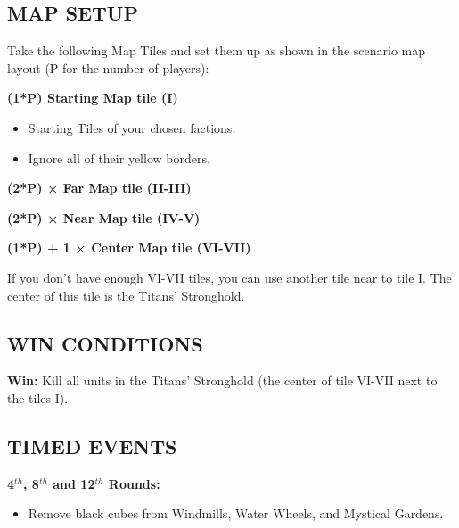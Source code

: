 \begin{multicols*}{2}
\subsection*{\MakeUppercase{Map setup}}

Take the following Map Tiles and set them up as shown in the scenario map layout (P for the number of players):

\textbf{(1*P) Starting Map tile (I)}
\begin{itemize}
    \item Starting Tiles of your chosen factions.
    \item Ignore all of their yellow borders.
\end{itemize}

\textbf{(2*P) × Far Map tile (II-III)}

\textbf{(2*P) × Near Map tile (IV-V)}

\textbf{(1*P) + 1 × Center Map tile (VI-VII)}

If you don't have enough VI-VII tiles, you can use another tile near to tile I.
The center of this tile is the Titans' Stronghold.

\subsection*{\MakeUppercase{Win Conditions}}

\textbf{Win:} Kill all units in the Titans' Stronghold (the center of tile VI-VII next to the tiles I).

\subsection*{\MakeUppercase{Timed Events}}

\textbf{4$^{th}$, 8$^{th}$ and 12$^{th}$ Rounds:}
\begin{itemize}
    \item Remove black cubes from Windmills, Water Wheels, and Mystical Gardens.
\end{itemize}


\end{multicols*}
